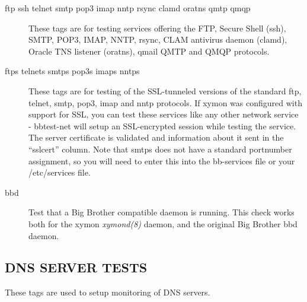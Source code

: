  \begin{description}
\item[ftp ssh telnet smtp pop3 imap nntp rsync clamd oratns qmtp qmqp]
  These tags are for testing services offering the FTP, Secure Shell
  (ssh), SMTP, POP3, IMAP, NNTP, rsync, CLAM antivirus daemon (clamd),
  Oracle TNS listener (oratns), qmail QMTP and QMQP protocols. 


 

\item[ftps telnets smtps pop3s imaps nntps] These tags are for testing
  of the SSL-tunneled versions of the standard ftp, telnet, smtp,
  pop3, imap and nntp protocols. If xymon was configured with support
  for SSL, you can test these services like any other network service
  - bbtest-net will setup an SSL-encrypted session while testing the
  service. The server certificate is validated and information about
  it sent in the ``sslcert'' column. Note that smtps does not have a
  standard portnumber assignment, so you will need to enter this into
  the bb-services file or your /etc/services file. 


 

\item[bbd] Test that a Big Brother compatible daemon is running. This
  check works both for the xymon \emph{xymond(8)} daemon, and the
  original Big Brother bbd daemon. 


 


 


\end{description}

\subsection{DNS SERVER TESTS}
 These tags are used to setup monitoring of DNS servers. 

